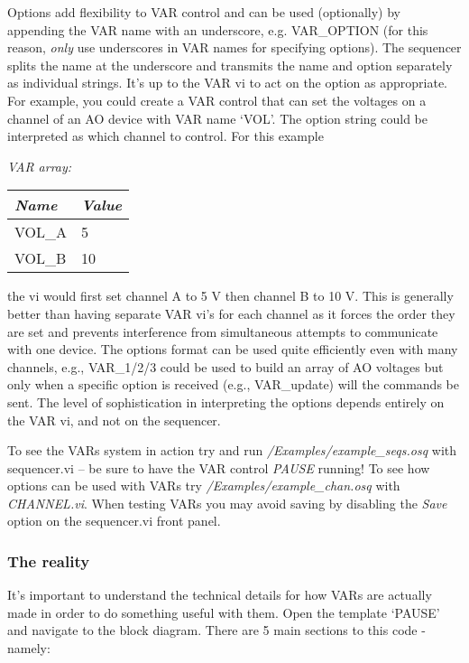 \documentclass[10pt,a4paper]{article}
\begin{document}
Options add flexibility to VAR control and can be used (optionally) by appending the VAR name with an underscore, e.g. VAR\_OPTION (for this reason, \emph{only} use underscores in VAR names for specifying options).  The sequencer splits the name at the underscore and transmits the name and option separately as individual strings.  It's up to the VAR vi to act on the option as appropriate.  For example, you could create a VAR control that can set the voltages on a channel of an AO device with VAR name `VOL'.  The option string could be interpreted as which channel to control. For this example

\hangindent=0.7cm
\emph{VAR array:} \\
\begin{tabularx}{0.3\textwidth}{X|X}
	\emph{Name} & \emph{Value} \\
	\hline
	VOL\_A & 5 \\
	VOL\_B & 10 \\
\end{tabularx}
\vspace{2mm}

\noindent the vi would first set channel A to 5 V then channel B to 10 V.  This is generally better than having separate VAR vi's for each channel as it forces the order they are set and prevents interference from simultaneous attempts to communicate with one device.  The options format can be used quite efficiently even with many channels, e.g., VAR\_1/2/3 could be used to build an array of AO voltages but only when a specific option is received (e.g., VAR\_update) will the commands be sent.  The level of sophistication in interpreting the options depends entirely on the VAR vi, and not on the sequencer. 

To see the VARs system in action try and run \emph{/Examples/example\_seqs.osq} with sequencer.vi -- be sure to have the VAR control \emph{PAUSE} running!  To see how options can be used with VARs try \emph{/Examples/example\_chan.osq} with \emph{CHANNEL.vi}. When testing VARs you may avoid saving by disabling the \emph{Save} option on the sequencer.vi front panel.

\subsubsection{The reality}

It's important to understand the technical details for how VARs are actually made in order to do something useful with them.  Open the template `PAUSE' and navigate to the block diagram.  There are 5 main sections to this code - namely:
\end{document}
